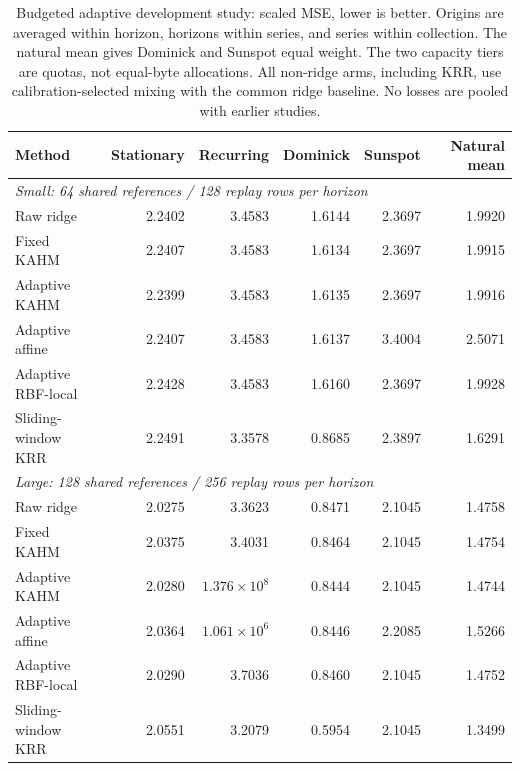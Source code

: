 \begin{table}[!htbp]
\centering\small\setlength{\tabcolsep}{5pt}
\caption{Budgeted adaptive development study: scaled MSE, lower is better. Origins are averaged within horizon, horizons within series, and series within collection. The natural mean gives Dominick and Sunspot equal weight. The two capacity tiers are quotas, not equal-byte allocations. All non-ridge arms, including KRR, use calibration-selected mixing with the common ridge baseline. No losses are pooled with earlier studies.}
\label{tab:adaptive-development-loss}
\begin{tabular}{@{}lrrrrr@{}}
\toprule
Method & Stationary & Recurring & Dominick & Sunspot & Natural mean \\
\midrule
\multicolumn{6}{l}{\textit{Small: 64 shared references / 128 replay rows per horizon}} \\
Raw ridge & 2.2402 & 3.4583 & 1.6144 & 2.3697 & 1.9920 \\
Fixed KAHM & 2.2407 & 3.4583 & 1.6134 & 2.3697 & 1.9915 \\
Adaptive KAHM & 2.2399 & 3.4583 & 1.6135 & 2.3697 & 1.9916 \\
Adaptive affine & 2.2407 & 3.4583 & 1.6137 & 3.4004 & 2.5071 \\
Adaptive RBF-local & 2.2428 & 3.4583 & 1.6160 & 2.3697 & 1.9928 \\
Sliding-window KRR & 2.2491 & 3.3578 & 0.8685 & 2.3897 & 1.6291 \\
\midrule
\multicolumn{6}{l}{\textit{Large: 128 shared references / 256 replay rows per horizon}} \\
Raw ridge & 2.0275 & 3.3623 & 0.8471 & 2.1045 & 1.4758 \\
Fixed KAHM & 2.0375 & 3.4031 & 0.8464 & 2.1045 & 1.4754 \\
Adaptive KAHM & 2.0280 & $1.376\times 10^{8}$ & 0.8444 & 2.1045 & 1.4744 \\
Adaptive affine & 2.0364 & $1.061\times 10^{6}$ & 0.8446 & 2.2085 & 1.5266 \\
Adaptive RBF-local & 2.0290 & 3.7036 & 0.8460 & 2.1045 & 1.4752 \\
Sliding-window KRR & 2.0551 & 3.2079 & 0.5954 & 2.1045 & 1.3499 \\
\bottomrule
\end{tabular}
\end{table}
